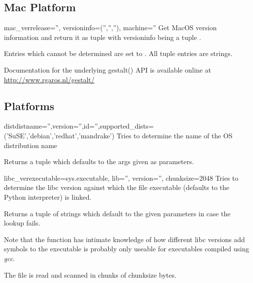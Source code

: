 \subsection{Mac Platform}

\begin{funcdesc}{mac_ver}{release='', versioninfo=('','',''), machine=''}
	Get MacOS version information and return it as tuple  with versioninfo being a tuple .
	
	Entries which cannot be determined are set to . All tuple
	entries are strings.

    Documentation for the underlying gestalt() API is available online 
    at \url{http://www.rgaros.nl/gestalt/}
\end{funcdesc}

\subsection{\UNIX{} Platforms}

\begin{funcdesc}{dist}{distname='',version='',id='',supported_dists=('SuSE','debian','redhat','mandrake')}
	Tries to determine the name of the OS distribution name
	
	Returns a tuple  which defaults to the
	args given as parameters.
\end{funcdesc}


\begin{funcdesc}{libc_ver}{executable=sys.executable, lib='', version='', chunksize=2048}
  Tries to determine the libc version against which the
  file executable (defaults to the Python interpreter) is linked.

  Returns a tuple of strings  which default to the
  given parameters in case the lookup fails.

  Note that the function has intimate knowledge of how different
  libc versions add symbols to the executable is probably only
  useable for executables compiled using \emph{gcc}.

  The file is read and scanned in chunks of chunksize bytes.
\end{funcdesc}
